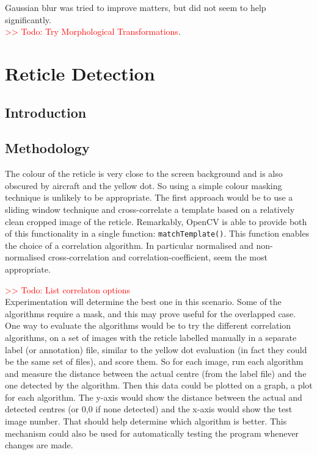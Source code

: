 \documentclass[final]{cmpreport_02}
\begin{document}
Gaussian blur was tried to improve matters, but did not seem to help significantly.\\
\textcolor{red}{>> Todo: Try Morphological Transformations}.\\


\section{Reticle Detection}

\subsection{Introduction}



\subsection{Methodology}

The colour of the reticle is very close to the screen background and is also obscured by aircraft and the yellow dot. So using a simple colour masking technique is unlikely to be appropriate. The first approach would be to use a sliding window technique and cross-correlate a template based on a relatively clean cropped image of the reticle. Remarkably, OpenCV is able to provide both of this functionality in a single function: \verb|matchTemplate()|. This function enables the choice of a correlation algorithm. In particular normalised and non-normalised cross-correlation and correlation-coefficient, seem the most appropriate.

\noindent
\textcolor{red}{>> Todo: List correlaton options}\\
Experimentation will determine the best one in this scenario. Some of the algorithms require a mask, and this may prove useful for the overlapped case. One way to evaluate the algorithms would be to try the different correlation algorithms, on a set of images with the reticle labelled manually in a separate label (or annotation) file, similar to the yellow dot evaluation (in fact they could be the same set of files), and score them. So for each image, run each algorithm and measure the distance between the actual centre (from the label file) and the one detected by the algorithm. Then this data could be plotted on a graph, a plot for each algorithm. The y-axis would show the distance between the actual and detected centres (or 0,0 if none detected) and the x-axis would show the test image number. That should help determine which algorithm is better. This mechanism could also be used for automatically testing the program whenever changes are made.
\end{document}
